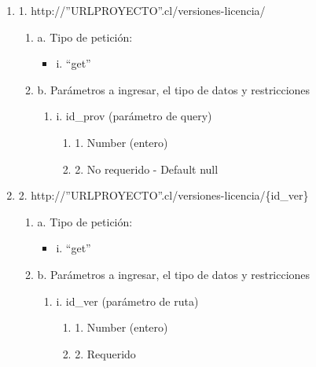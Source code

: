 \begin{enumerate}
    \item 1. http://”URLPROYECTO”.cl/versiones-licencia/
    \begin{enumerate}
        \item a. Tipo de petición:
            \begin{itemize}
               \item i. “get”
            \end{itemize}
        \item b. Parámetros a ingresar, el tipo de datos y restricciones
            \begin{enumerate}
                \item i. id\_prov (parámetro de query)
                    \begin{enumerate}
                        \item 1. Number (entero)
                        \item 2. No requerido - Default null
                    \end{enumerate}
            \end{enumerate}
    \end{enumerate}

    \item 2. http://”URLPROYECTO”.cl/versiones-licencia/\{id\_ver\}
    \begin{enumerate}
        \item a. Tipo de petición:
            \begin{itemize}
               \item i. “get”
            \end{itemize}
        \item b. Parámetros a ingresar, el tipo de datos y restricciones
            \begin{enumerate}
                \item i. id\_ver (parámetro de ruta)
                    \begin{enumerate}
                        \item 1. Number (entero)
                        \item 2. Requerido
                    \end{enumerate}
            \end{enumerate}
    \end{enumerate}


\end{enumerate}

